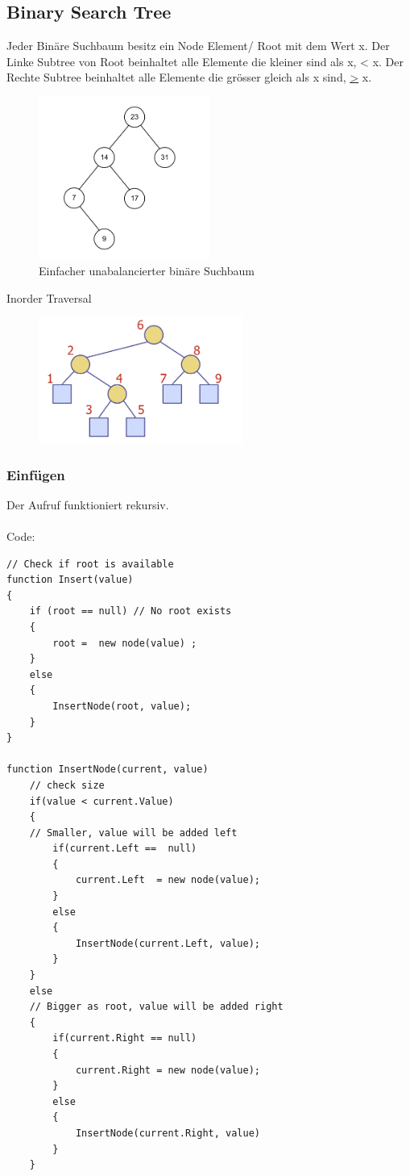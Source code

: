 \documentclass[a4paper,10pt]{report}
\begin{document}
\subsection{Binary Search Tree}
Jeder Binäre Suchbaum besitz ein Node Element/ Root mit dem Wert x. Der Linke Subtree von Root beinhaltet alle Elemente die kleiner sind als x, < x. Der Rechte Subtree beinhaltet alle Elemente die grösser gleich als x sind, \underline{>} x.
\begin{figure}[H]
\begin{center}
  	\includegraphics[width=0.5\textwidth]{img/binarysearchtree.png}
	\caption{Einfacher unabalancierter binäre Suchbaum}
\end{center}
\end{figure}
Inorder Traversal
\begin{figure}[H]
	\begin{center}
  		\includegraphics[width=0.6\textwidth]{img/bstinorder.png}
	\end{center}
\end{figure}
\newpage
\subsubsection{Einfügen}
Der Aufruf funktioniert rekursiv.\\
\\
Code:
\begin{lstlisting}
// Check if root is available
function Insert(value)
{
	if (root == null) // No root exists 
	{
		root =  new node(value) ;
	}
	else
	{
		InsertNode(root, value);
	}
}

function InsertNode(current, value)
	// check size
	if(value < current.Value)
	{
	// Smaller, value will be added left
		if(current.Left ==  null)
		{
			current.Left  = new node(value);
		}
		else
		{
			InsertNode(current.Left, value);
		}
	}
	else
	// Bigger as root, value will be added right
	{
		if(current.Right == null)
		{
			current.Right = new node(value);
		}
		else
		{
			InsertNode(current.Right, value)
		}
	}
\end{lstlisting}
\newpage
\end{document}
